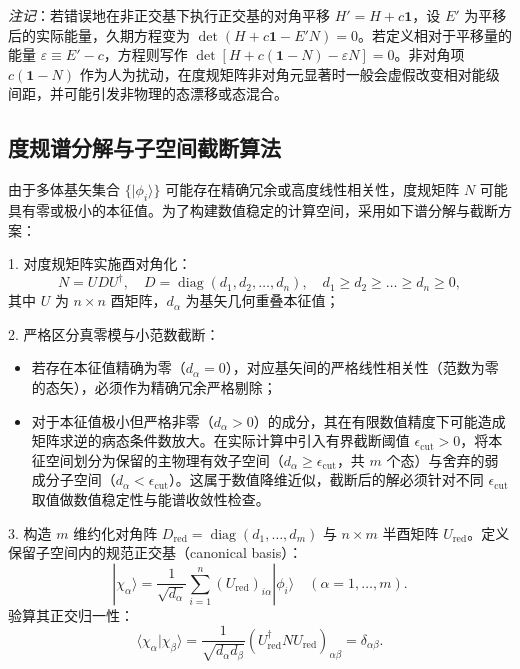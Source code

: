 \textit{注记}：若错误地在非正交基下执行正交基的对角平移 $H' = H + c \mathbf{1}$，设 $E'$ 为平移后的实际能量，久期方程变为 $\det(H + c \mathbf{1} - E' N) = 0$。若定义相对于平移量的能量 $\varepsilon \equiv E' - c$，方程则写作 $\det[H + c(\mathbf{1} - N) - \varepsilon N] = 0$。非对角项 $c(\mathbf{1} - N)$ 作为人为扰动，在度规矩阵非对角元显著时一般会虚假改变相对能级间距，并可能引发非物理的态漂移或态混合。

\subsection{度规谱分解与子空间截断算法}

由于多体基矢集合 $\{ |\phi_i\rangle \}$ 可能存在精确冗余或高度线性相关性，度规矩阵 $N$ 可能具有零或极小的本征值。为了构建数值稳定的计算空间，采用如下谱分解与截断方案：

1. 对度规矩阵实施酉对角化：
\begin{equation}\label{eq:appB-N-diag}
N = U D U^\dagger, \quad D = \operatorname{diag}(d_1, d_2, \dots, d_n), \quad d_1 \ge d_2 \ge \dots \ge d_n \ge 0,
\end{equation}
其中 $U$ 为 $n \times n$ 酉矩阵，$d_\alpha$ 为基矢几何重叠本征值；

2. 严格区分真零模与小范数截断：
\begin{itemize}
\item 若存在本征值精确为零（$d_\alpha = 0$），对应基矢间的严格线性相关性（范数为零的态矢），必须作为精确冗余严格剔除；
\item 对于本征值极小但严格非零（$d_\alpha > 0$）的成分，其在有限数值精度下可能造成矩阵求逆的病态条件数放大。在实际计算中引入有界截断阈值 $\epsilon_{\text{cut}} > 0$，将本征空间划分为保留的主物理有效子空间（$d_\alpha \ge \epsilon_{\text{cut}}$，共 $m$ 个态）与舍弃的弱成分子空间（$d_\alpha < \epsilon_{\text{cut}}$）。这属于数值降维近似，截断后的解必须针对不同 $\epsilon_{\text{cut}}$ 取值做数值稳定性与能谱收敛性检查。
\end{itemize}

3. 构造 $m$ 维约化对角阵 $D_{\text{red}} = \operatorname{diag}(d_1, \dots, d_m)$ 与 $n \times m$ 半酉矩阵 $U_{\text{red}}$。定义保留子空间内的规范正交基（canonical basis）：
\begin{equation}\label{eq:appB-canonical-basis}
|\chi_\alpha\rangle = \frac{1}{\sqrt{d_\alpha}} \sum_{i=1}^n (U_{\text{red}})_{i\alpha} |\phi_i\rangle \quad (\alpha = 1, \dots, m).
\end{equation}
验算其正交归一性：
\begin{equation}
\langle \chi_\alpha | \chi_\beta \rangle = \frac{1}{\sqrt{d_\alpha d_\beta}} (U_{\text{red}}^\dagger N U_{\text{red}})_{\alpha\beta} = \delta_{\alpha\beta}.
\end{equation}

